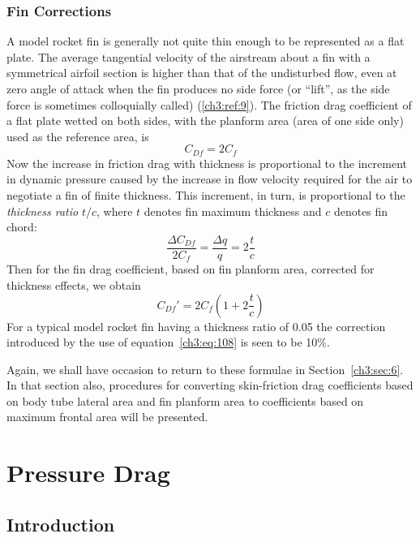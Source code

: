 \subsubsection{Fin Corrections}\label{ch3:sec:3.6.2}

A model rocket fin is generally not quite thin enough to be represented as a
flat plate. The average tangential velocity of the airstream about a fin with a
symmetrical airfoil section is higher than that of the undisturbed flow, even
at zero angle of attack when the fin produces no side force (or ``lift'', as
the side force is sometimes colloquially called) (\ref{ch3:ref:9}). The
friction drag coefficient of a flat plate wetted on both sides, with the
planform area (area of one side only) used as the reference area, is
\begin{equation}\label{ch3:eq:106}
C_{Df} = 2C_f
\end{equation}
Now the increase in friction drag with thickness is proportional to the
increment in dynamic pressure caused by the increase in flow velocity required
for the air to negotiate a fin of finite thickness. This increment, in turn, is
proportional to the \emph{thickness ratio} $t/c$, where $t$ denotes fin maximum
thickness and $c$ denotes fin chord:
\begin{equation}\label{ch3:eq:107}
\frac{\Delta C_{Df}}{2C_f} = \frac{\Delta q}{q} = 2\frac{t}{c}
\end{equation}
Then for the fin drag coefficient, based on fin planform area, corrected for
thickness effects, we obtain
\begin{equation}\label{ch3:eq:108}
C_{Df}' = 2C_f\left(1 + 2\frac{t}{c}\right)
\end{equation}
For a typical model rocket fin having a thickness ratio of 0.05 the correction
introduced by the use of equation~\eqref{ch3:eq:108} is seen to be 10\%.

Again, we shall have occasion to return to these formulae in
Section~\ref{ch3:sec:6}. In that section also, procedures for converting
skin-friction drag coefficients based on body tube lateral area and fin
planform area to coefficients based on maximum frontal area will be presented.

\section{Pressure Drag}\label{ch3:sec:4}

\subsection{Introduction}\label{ch3:sec:4.1}

